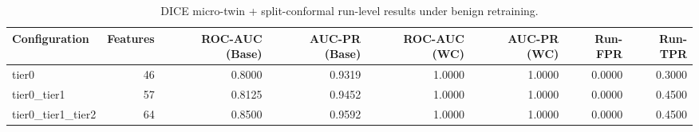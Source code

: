 \begin{table}[t]
\centering
\caption{DICE micro-twin + split-conformal run-level results under benign retraining.}
\label{tab:dice_full_overall}
\footnotesize
\begin{tabular}{lrrrrrrr}
\toprule
Configuration & Features & ROC-AUC (Base) & AUC-PR (Base) & ROC-AUC (WC) & AUC-PR (WC) & Run-FPR & Run-TPR \\
\midrule
tier0 & 46 & 0.8000 & 0.9319 & 1.0000 & 1.0000 & 0.0000 & 0.3000 \\
tier0_tier1 & 57 & 0.8125 & 0.9452 & 1.0000 & 1.0000 & 0.0000 & 0.4500 \\
tier0_tier1_tier2 & 64 & 0.8500 & 0.9592 & 1.0000 & 1.0000 & 0.0000 & 0.4500 \\
\bottomrule
\end{tabular}

\end{table}
